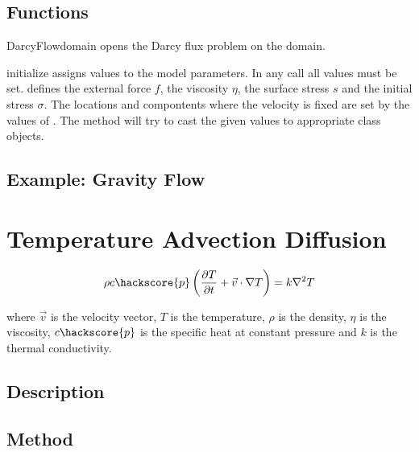 \subsection{Functions}
\begin{classdesc}{DarcyFlow}{domain}
opens the Darcy flux problem on the \Domain domain.
\end{classdesc}

\begin{methoddesc}[DarcyFlow]{initialize}{}
assigns values to the model parameters. In any call all values must be set.
 defines the external force $f$,  the viscosity $\eta$,
 the surface stress $s$ and  the initial stress $\sigma$.
The locations and compontents where the velocity is fixed are set by 
the values of . The method will try to cast the given values to appropriate 
\Data class objects.
\end{methoddesc}


\subsection{Example: Gravity Flow}

\section{Temperature Advection Diffusion\label{TEMP ADV DIFF}}

\begin{equation}
\rho c\hackscore{p} \left (\frac{\partial T}{\partial t} + \vec{v} \cdot \nabla T \right ) = k \nabla^{2}T
\label{HEAT EQUATION}
\end{equation}

where $\vec{v}$ is the velocity vector, $T$ is the temperature, $\rho$ is the density, $\eta$ is the viscosity, $c\hackscore{p}$ is the specific heat at constant pressure and $k$ is the thermal conductivity.

\subsection{Description}

\subsection{Method}

